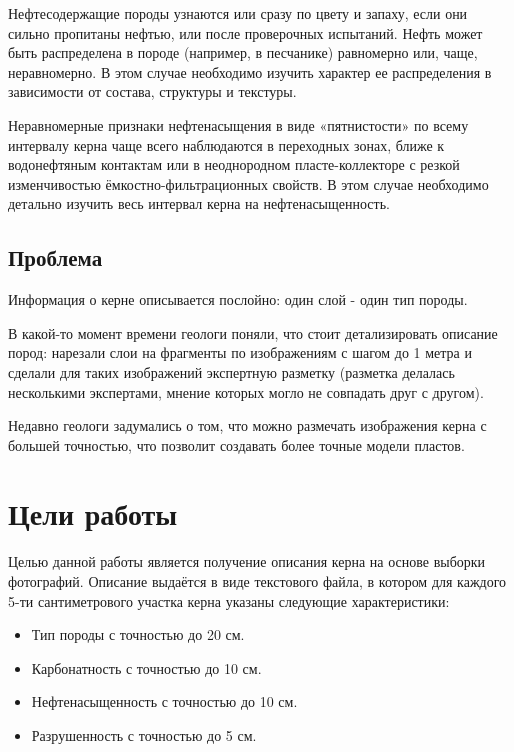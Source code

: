 \documentclass[14pt]{matmex-diploma}
\begin{document}
        Нефтесодержащие породы узнаются или сразу по цвету и запаху, если они сильно пропитаны нефтью, или после проверочных испытаний. Нефть может быть распределена в породе (например, в песчанике) равномерно или, чаще, неравномерно. В этом случае необходимо изучить характер ее распределения в зависимости от состава, структуры и текстуры.
        
        Неравномерные признаки нефтенасыщения в виде «пятнистости» по всему интервалу керна чаще всего наблюдаются в переходных зонах, ближе к водонефтяным контактам или в неоднородном пласте-коллекторе с резкой изменчивостью ёмкостно-фильтрационных свойств. В этом случае необходимо детально изучить весь интервал керна на нефтенасыщенность. \cite{paper:oil}
        
    \subsection*{Проблема}
        
        Информация о керне описывается послойно: один слой - один тип породы.
        
        В какой-то момент времени геологи поняли, что стоит детализировать описание пород: нарезали слои на фрагменты по изображениям с шагом до 1 метра и сделали для таких изображений экспертную разметку (разметка делалась несколькими экспертами, мнение которых могло не совпадать друг с другом).
        
        Недавно геологи задумались о том, что можно размечать изображения керна с большей точностью, что позволит создавать более точные модели пластов.


\section{Цели работы}

    Целью данной работы является получение описания керна на основе выборки фотографий. Описание выдаётся в виде текстового файла, в котором для каждого 5-ти сантиметрового участка керна указаны следующие характеристики:
    
    \begin{itemize}
        \item Тип породы с точностью до 20 см. 
        \item Карбонатность с точностью до 10 см.
        \item Нефтенасыщенность с точностью до 10 см.
        \item Разрушенность с точностью до 5 см.
    \end{itemize}
    
\end{document}
